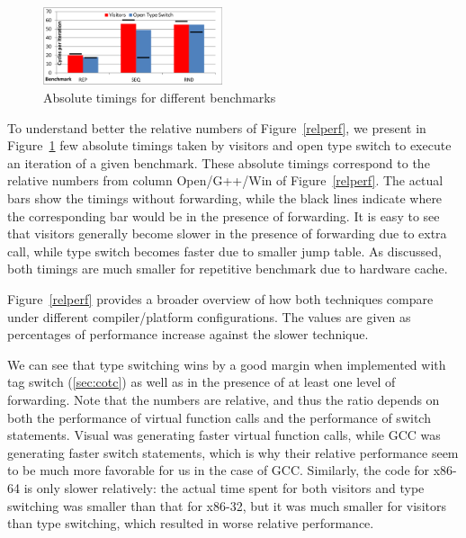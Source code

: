 \begin{figure}[htbp]
  \centering
    \includegraphics[width=0.47\textwidth]{VisitorsCompare.pdf}
  \caption{Absolute timings for different benchmarks}
  \label{fig:VisitorsComparison}
\end{figure}

To understand better the relative numbers of Figure~\ref{relperf}, we present 
in Figure~\ref{fig:VisitorsComparison} few absolute timings taken by visitors 
and open type switch to execute an iteration of a given benchmark. These absolute timings 
correspond to the relative numbers from column Open/G++/Win of Figure~\ref{relperf}.
The actual bars show the timings without forwarding, while the black lines 
indicate where the corresponding bar would be in the presence of forwarding. It 
is easy to see that visitors generally become slower in the presence of 
forwarding due to extra call, while type switch becomes faster due to smaller 
jump table. As discussed, both timings are much smaller for repetitive benchmark 
due to hardware cache.

Figure~\ref{relperf} provides a broader overview of how both techniques compare 
under different compiler/platform configurations. The values are given as 
percentages of performance increase against the slower technique. 

We can see that type switching wins by a good margin when implemented with tag switch (\textsection\ref{sec:cotc}) as  
well as in the presence of at least one level of forwarding. Note that the 
numbers are relative, and thus the ratio depends on both the performance of 
virtual function calls and the performance of switch statements. Visual \Cpp{} was 
generating faster virtual function calls, while GCC was generating faster switch 
statements, which is why their relative performance seem to be much more 
favorable for us in the case of GCC.
Similarly, the code for x86-64 is only slower relatively: the actual time spent for 
both visitors and type switching was smaller than that for x86-32, but it was much 
smaller for visitors than type switching, which resulted in worse relative 
performance.

